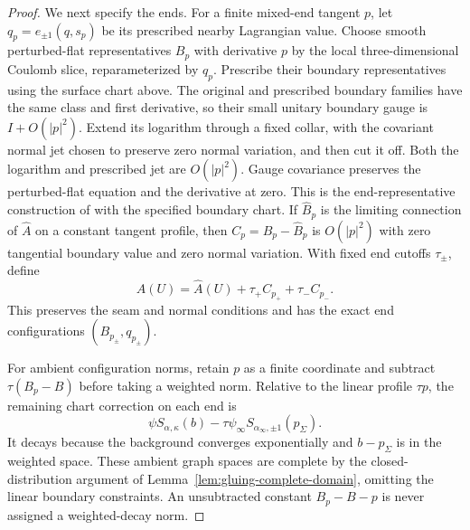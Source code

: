 \documentclass[11pt]{amsart}
\theoremstyle{definition}
\theoremstyle{remark}
\theoremstyle{plain}
\begin{document}
\begin{proof}
We next specify the ends. For a finite mixed-end tangent $p$, let
$q_p=e_{\pm1}(q,s_p)$ be its prescribed nearby Lagrangian value.
Choose smooth perturbed-flat representatives $B_p$ with derivative
$p$ by the local three-dimensional Coulomb slice, reparameterized
by $q_p$. Prescribe their boundary representatives using the surface
chart above. The original and prescribed boundary families have the
same class and first derivative, so their small unitary boundary
gauge is $I+O(|p|^2)$. Extend its logarithm through a fixed collar,
with the covariant normal jet chosen to preserve zero normal variation,
and then cut it off. Both the logarithm and prescribed jet are
$O(|p|^2)$. Gauge covariance preserves the perturbed-flat equation
and the derivative at zero. This is the end-representative construction
of \cite[Section~4.1]{DaeFukLip21a} with the specified boundary chart.
If $\widehat B_p$ is the limiting connection of $\widehat A$
on a constant tangent profile, then
$C_p=B_p-\widehat B_p$ is $O(|p|^2)$ with zero tangential
boundary value and zero normal variation. With fixed end cutoffs
$\tau_\pm$, define
\begin{equation}\label{eq:gluing-exact-end-chart}
          A(U)=\widehat A(U)+\tau_+C_{p_+}+\tau_-C_{p_-}.
\end{equation}
This preserves the seam and normal conditions and has the exact
end configurations $(B_{p_\pm},q_{p_\pm})$.

For ambient configuration norms, retain $p$ as a finite coordinate
and subtract $\tau(B_p-B)$ before taking a weighted norm.
Relative to the linear profile $\tau p$, the remaining chart
correction on each end is
\begin{equation}\label{eq:gluing-chart-end-subtraction}
       \psi S_{\alpha,\kappa}(b)
               -\tau\psi_\infty S_{\alpha_\infty,\pm1}(p_\Sigma).
\end{equation}
It decays because the background converges exponentially and
$b-p_\Sigma$ is in the weighted space. These ambient graph
spaces are complete by the closed-distribution argument of
Lemma~\ref{lem:gluing-complete-domain}, omitting the linear
boundary constraints. An unsubtracted constant $B_p-B-p$ is
never assigned a weighted-decay norm.


\end{proof}
\end{document}
